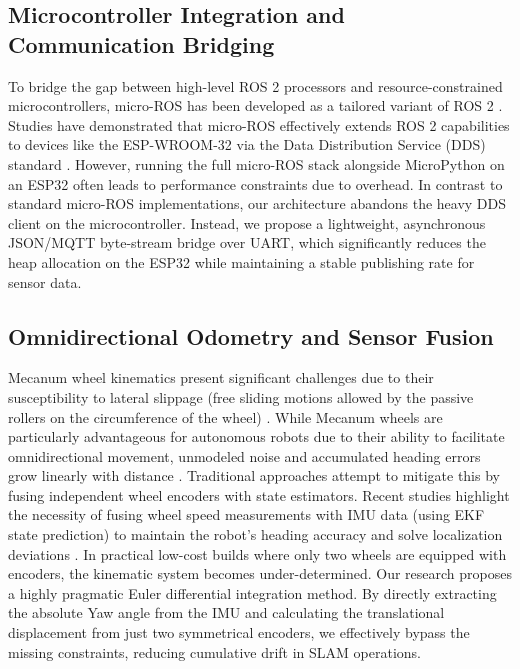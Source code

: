 \documentclass{llncs}
\begin{document}
\subsection{Microcontroller Integration and Communication Bridging}
To bridge the gap between high-level ROS 2 processors and resource-constrained microcontrollers, micro-ROS has been developed as a tailored variant of ROS 2 \cite{ieee_microros_attitude_2023}. Studies have demonstrated that micro-ROS effectively extends ROS 2 capabilities to devices like the ESP-WROOM-32 via the Data Distribution Service (DDS) standard \cite{ieee_microros_attitude_2023}. However, running the full micro-ROS stack alongside MicroPython on an ESP32 often leads to performance constraints due to overhead. In contrast to standard micro-ROS implementations, our architecture abandons the heavy DDS client on the microcontroller. Instead, we propose a lightweight, asynchronous JSON/MQTT byte-stream bridge over UART, which significantly reduces the heap allocation on the ESP32 while maintaining a stable publishing rate for sensor data.

\subsection{Omnidirectional Odometry and Sensor Fusion}
Mecanum wheel kinematics present significant challenges due to their susceptibility to lateral slippage (free sliding motions allowed by the passive rollers on the circumference of the wheel) \cite{cambridge_mecanum_2016}. While Mecanum wheels are particularly advantageous for autonomous robots due to their ability to facilitate omnidirectional movement, unmodeled noise and accumulated heading errors grow linearly with distance \cite{mdpi_robust_slam_2021}. Traditional approaches attempt to mitigate this by fusing independent wheel encoders with state estimators. Recent studies highlight the necessity of fusing wheel speed measurements with IMU data (using EKF state prediction) to maintain the robot's heading accuracy and solve localization deviations \cite{mdpi_robust_slam_2021}. 
In practical low-cost builds where only two wheels are equipped with encoders, the kinematic system becomes under-determined. Our research proposes a highly pragmatic Euler differential integration method. By directly extracting the absolute Yaw angle from the IMU and calculating the translational displacement from just two symmetrical encoders, we effectively bypass the missing constraints, reducing cumulative drift in SLAM operations.
\end{document}
